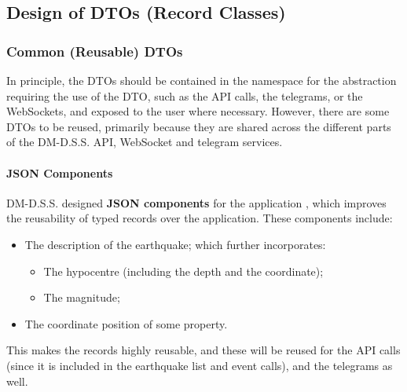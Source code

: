 \subsection{Design of DTOs (Record Classes)}

\subsubsection{Common (Reusable) DTOs}

In principle, the DTOs should be contained in the namespace for the abstraction requiring the use of the DTO, such as the API calls, the telegrams, or the WebSockets, and exposed to the user where necessary. However, there are some DTOs to be reused, primarily because they are shared across the different parts of the DM-D.S.S. API, WebSocket and telegram services.

\paragraph{JSON Components}

DM-D.S.S. designed \textbf{JSON components} for the application \autocite{dmdata-references-json}, which improves the reusability of typed records over the application. These components include:
\begin{itemize}
    \item The description of the earthquake; which further incorporates:
          \begin{itemize}
              \item The hypocentre (including the depth and the coordinate);
              \item The magnitude;
          \end{itemize}
    \item The coordinate position of some property.
\end{itemize}

This makes the records highly reusable, and these will be reused for the API calls (since it is included in the earthquake list and event calls), and the telegrams as well.

